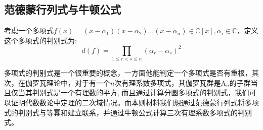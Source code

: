 \documentclass[a4paper,12pt]{ctexart}
\begin{document}
\subsection{范德蒙行列式与牛顿公式}
考虑一个多项式$f(x)=(x-\alpha_1)(x-\alpha_2)\dots(x-\alpha_n)\in \mathbb{C}[x],\alpha_i\in \mathbb{C}$，定义这个多项式的判别式为:
\begin{equation*}
    d(f)=\prod_{1\le r<s\le n}(\alpha_r-\alpha_s)^2
\end{equation*}

多项式的判别式是一个很重要的概念，一方面他能判定一个多项式是否有重根，其次，在伽罗瓦理论中，对于有一个$n$次有理系数多项式，其伽罗瓦群是$\text{A}_n$的子群当且仅当其判别式是一个有理数的平方,
而且通过计算分圆多项式的判别式，我们可以证明代数数论中定理的二次域情况。而本则材料我们想通过范德蒙行列式将多项式的判别式与等幂和建立联系，并通过牛顿公式计算三次有理系数多项式的判别式。
\end{document}
